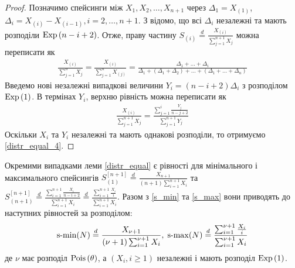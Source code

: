 \begin{proof}
    Позначимо спейсинги між $X_1, X_2, \dots, X_{n+1}$ через
    $\Delta_1 = X_{(1)}$,
    $\Delta_i = X_{(i)} - X_{(i-1)}, i=2, \dots, n+1$. З \cite{Arnold_et_al_2008} відомо, що
    всі $\Delta_i$ незалежні та мають розподіли $\mathrm{Exp}\left(n-i+2\right)$.
    Отже, праву частину $S_{(i)} \overset{d}{=} \frac{X_{(i)}}{\sum_{j=1}^{n+1}X_j}$
    можна переписати як
    \begin{gather*}
        \frac{X_{(i)}}{\sum_{j=1}^{n}X_j} = 
        \frac{X_{(i)}}{\sum_{j=1}^{n}X_{(j)}} = 
        \frac{
            \Delta_1 + \dots + \Delta_i
        }{
            \Delta_1 + \left(\Delta_1 + \Delta_2\right) +
            \dots + \left(\Delta_1 + \dots + \Delta_n\right)
        }
    \end{gather*}
    Введемо нові незалежні випадкові величини
    $Y_i = (n-i+2)\Delta_i$ з розподілом
    $\mathrm{Exp}\left(1\right)$. В термінах $Y_i$,
    верхню рівність можна переписати як
    \begin{gather*}
        \frac{X_{(i)}}{\sum_{j=1}^{n+1}X_j} = 
        \frac{
            \sum_{j=1}^i \frac{Y_j}{n-j+2} 
        }{
            \sum_{j=1}^{n+1} Y_j
        }
    \end{gather*}
    Оскільки $X_i$ та $Y_i$ незалежні та мають однакові розподіли, то отримуємо \eqref{distr_equal_4}.
\end{proof}

Окремими випадками леми \ref{distr_equal}
є рівності для мінімального і максимального спейсингів
$S_{(1)}^{[n+1]} \overset{d}{=} \frac{X_{n+1}}{(n+1)\sum_{i=1}^{n+1} X_i}$
та $S_{(n+1)}^{[n+1]} \overset{d}{=} \frac{\sum_{i=1}^{n+1} \frac{X_i}{n-i+2}}{\sum_{i=1}^{n+1} X_i}
\overset{d}{=} \frac{\sum_{i=1}^{n+1} \frac{X_i}{i}}{\sum_{i=1}^{n+1} X_i}$.
Разом з \eqref{s_min} та \eqref{s_max}
вони приводять до наступних рівностей за розподілом:
\begin{gather}\label{distr_equal_5}
    \operatorname{s-min}(N) \overset{d}{=}
    \frac{X_{\nu+1}}{(\nu+1)\sum_{i=1}^{\nu+1} X_i} , \;
    \operatorname{s-max}(N) \overset{d}{=} 
    \frac{\sum_{i=1}^{\nu+1} \frac{X_i}{i}}{\sum_{i=1}^{\nu+1} X_i}
\end{gather}
де $\nu$ має розподіл $\mathrm{Pois}\left(\theta\right)$, а $\left(X_i, i\geq 1\right)$ незалежні і мають розподіл $\mathrm{Exp}\left(1\right)$.

